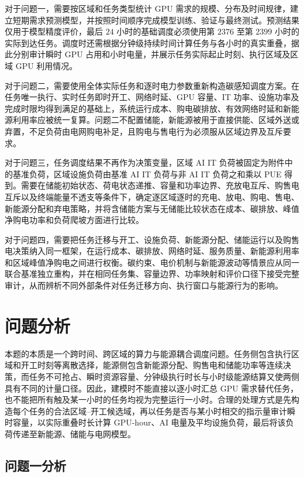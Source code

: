 \documentclass[withoutpreface,bwprint]{cumcmthesis}
\begin{document}
对于问题一，需要按区域和任务类型统计 GPU 需求的规模、分布及时间规律，建立短期需求预测模型，并按照时间顺序完成模型训练、验证与最终测试。预测结果仅用于模型精度评价，最后 $24$ 小时的基础调度必须使用第 $2376$ 至第 $2399$ 小时的实际到达任务。调度时还需根据分钟级持续时间计算任务与各小时的真实重叠，据此分别审计瞬时 GPU 占用和小时电量，并展示任务实际起止时刻、执行区域及区域 GPU 利用情况。

对于问题二，需要使用全体实际任务和逐时电力参数重新构造碳感知调度方案。在任务唯一执行、实时任务即时开工、网络时延、GPU 容量、IT 功率、设施功率及完成时限均得到满足的基础上，系统运行成本、购电碳排放、有效网络时延和新能源利用率应被统一复算。问题二不配置储能，新能源被用于直接供能、区域外送或弃置，不足负荷由电网购电补足，且购电与售电行为必须服从区域边界及互斥要求。

对于问题三，任务调度结果不再作为决策变量，区域 AI IT 负荷被固定为附件中的基准负荷，区域设施负荷由基准 AI IT 负荷与非 AI IT 负荷之和乘以 PUE 得到。需要在储能初始状态、荷电状态递推、容量和功率边界、充放电互斥、购售电互斥以及终端能量不透支等条件下，确定逐区域逐时的充电、放电、购电、售电、新能源分配和弃电策略，并将含储能方案与无储能比较状态在成本、碳排放、峰值净购电功率和负荷爬坡方面进行比较。

对于问题四，需要把任务迁移与开工、设施负荷、新能源分配、储能运行以及购售电决策纳入同一框架，在运行成本、碳排放、网络时延、服务质量、新能源利用率和区域峰值净购电之间进行权衡。碳约束、电价机制与新能源波动等情景应从同一联合基准独立重构，并在相同任务集、容量边界、功率映射和评价口径下接受完整审计，从而辨析不同外部条件对任务迁移方向、执行窗口与能源行为的影响。

\section{问题分析}

本题的本质是一个跨时间、跨区域的算力与能源耦合调度问题。任务侧包含执行区域和开工时刻等离散选择，能源侧包含新能源分配、购售电和储能功率等连续决策，而任务不可抢占、瞬时资源容量、分钟级执行时长与小时级能源结算又使两侧具有不同的计量口径。因此，建模时不能直接以逐小时汇总 GPU 需求替代任务，也不能把所有触及某一小时的任务均视为完整运行一小时。合理的处理方式是先构造每个任务的合法区域--开工候选域，再以任务是否与某小时相交的指示量审计瞬时容量，以实际重叠时长计算 GPU-hour、AI 电量及平均设施负荷，最后将该负荷传递至新能源、储能与电网模型。

\subsection{问题一分析}
\end{document}
